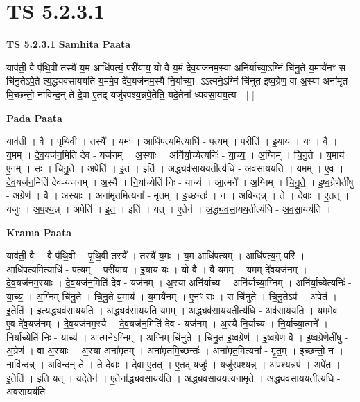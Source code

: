 \documentclass[17pt]{extarticle}
\begin{document}
\section{ TS 5.2.3.1 }

\textbf{TS 5.2.3.1 } \newline
\textbf{Samhita Paata} \newline

याव॑ती॒ वै पृ॑थि॒वी तस्यै॑ य॒म आधि॑पत्यं॒ परी॑याय॒ यो वै य॒मं दे॑व॒यज॑नम॒स्या अनि॑र्याच्या॒ऽग्निं चि॑नु॒ते य॒मायै॑नꣳ॒॒ स चि॑नु॒तेऽपे॒ते-त्य॒द्ध्यव॑साययति य॒ममे॒व दे॑व॒यज॑नम॒स्यै नि॒र्याच्या॒- ऽऽत्मने॒ऽग्निं चि॑नुत इष्व॒ग्रेण॒ वा अ॒स्या अना॑मृत-मि॒च्छन्तो॒ नावि॑न्द॒न् ते दे॒वा ए॒तद्-यजु॑रपश्य॒न्नपे॒तेति॒ यदे॒तेना᳚-ध्यवसा॒यय॒त्य - [  ] \newline

\textbf{Pada Paata} \newline

याव॑ती । वै । पृ॒थि॒वी । तस्यै᳚ । य॒मः । आधि॑पत्य॒मित्याधि॑ - प॒त्य॒म् । परीति॑ । इ॒या॒य॒ । यः । वै । य॒मम् । दे॒व॒यज॑न॒मिति॑ देव - यज॑नम् । अ॒स्याः । अनि॑र्या॒च्येत्यनिः॑ - या॒च्य॒ । अ॒ग्निम् । चि॒नु॒ते । य॒माय॑ । ए॒न॒म् । सः । चि॒नु॒ते॒ । अपेति॑ । इ॒त॒ । इति॑ । अ॒द्ध्यव॑सायय॒तीत्य॑धि - अव॑साययति । य॒मम् । ए॒व । दे॒व॒यज॑न॒मिति॑ देव-यज॑नम् । अ॒स्यै । नि॒र्याच्येति॑ निः - याच्य॑ । आ॒त्मने᳚ । अ॒ग्निम् । चि॒नु॒ते॒ । इ॒ष्व॒ग्रेणेती॑षु - अ॒ग्रेण॑ । वै । अ॒स्याः । अना॑मृत॒मित्यना᳚ - मृ॒त॒म् । इ॒च्छन्तः॑ । न । अ॒वि॒न्द॒न्न् । ते । दे॒वाः । ए॒तत् । यजुः॑ । अ॒प॒श्य॒न्न् । अपेति॑ । इ॒त॒ । इति॑ । यत् । ए॒तेन॑ । अ॒द्ध्य॒व॒सा॒यय॒तीत्य॑धि - अ॒व॒सा॒यय॑ति ।  \newline


\textbf{Krama Paata} \newline

याव॑ती॒ वै । वै पृ॑थि॒वी । पृ॒थि॒वी तस्यै᳚ । तस्यै॑ य॒मः । य॒म आधि॑पत्यम् । आधि॑पत्य॒म् परि॑ । आधि॑पत्य॒मित्याधि॑ - प॒त्य॒म् । परी॑याय । इ॒या॒य॒ यः । यो वै । वै य॒मम् । य॒मम् दे॑व॒यज॑नम् । दे॒व॒यज॑नम॒स्याः । दे॒व॒यज॑न॒मिति॑ देव - यज॑नम् । अ॒स्या अनि॑र्याच्य । अनि॑र्याच्या॒ग्निम् । अनि॑र्या॒च्येत्यनिः॑ - या॒च्य॒ । अ॒ग्निम् चि॑नु॒ते । चि॒नु॒ते य॒माय॑ । य॒मायै॑नम् । ए॒नꣳ॒॒ सः । स चि॑नुते । चि॒नु॒तेऽप॑ । अपेत॑ । इ॒तेति॑ । इत्य॒द्ध्यव॑साययति । अ॒द्ध्यव॑साययति य॒मम् । अ॒द्ध्यव॑सायय॒तीत्य॑धि - अव॑साययति । य॒ममे॒व । ए॒व दे॑व॒यज॑नम् । दे॒व॒यज॑नम॒स्यै । दे॒व॒यज॑न॒मिति॑ देव - यज॑नम् । अ॒स्यै नि॒र्याच्य॑ । नि॒र्याच्या॒त्मने᳚ । नि॒र्याच्येति॑ निः - याच्य॑ । आ॒त्मने॒ऽग्निम् । अ॒ग्निम् चि॑नुते । चि॒नु॒त॒ इ॒ष्व॒ग्रेण॑ । इ॒ष्व॒ग्रेण॒ वै । इ॒ष्व॒ग्रेणेती॑षु - अ॒ग्रेण॑ । वा अ॒स्याः । अ॒स्या अना॑मृतम् । अना॑मृतमि॒च्छन्तः॑ । अना॑मृत॒मित्यना᳚ - मृ॒त॒म् । इ॒च्छन्तो॒ न । नावि॑न्दन्न् । अ॒वि॒न्द॒न् ते । ते दे॒वाः । दे॒वा ए॒तत् । ए॒तद् यजुः॑ । यजु॑रपश्यन्न् । अ॒प॒श्य॒न्नप॑ । अपे॑त । इ॒तेति॑ । इति॒ यत् । यदे॒तेन॑ । ए॒तेना᳚द्ध्यवसा॒यय॑ति । अ॒द्ध्य॒व॒सा॒यय॒त्यना॑मृते । अ॒द्ध्य॒व॒सा॒यय॒तीत्य॑धि - अ॒व॒सा॒यय॑ति \newline
\end{document}
